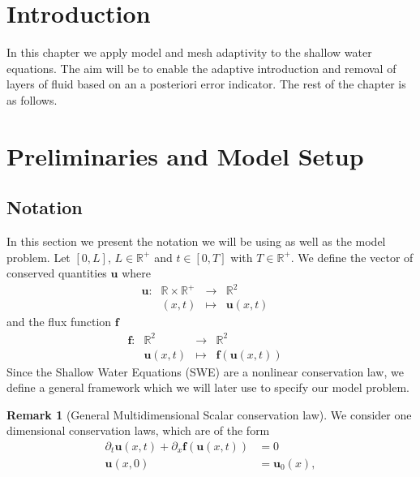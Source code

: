 \documentclass[12pt,a4paper]{article}
\numberwithin{equation}{section}
\theoremstyle{definition}
\newcommand{\dfunkmapsto}[5]{\ensuremath{
		\begin{array}{rccl}
			{#1}: & {#2} &\to&{#3}
			\\
			& {#4} &\mapsto&{#5}
		\end{array}\quad}}
\newcommand{\vect}[1]{\textbf{#1}}
\newcommand{\qp}[1]{\left(#1\right)}
\newcommand{\qb}[1]{\left[#1\right]}
\newtheorem{Rem}[subsection]{Remark}
\begin{document}
\section{Introduction}\label{sec_intro}
In this chapter we apply model and mesh adaptivity to the shallow water equations. The aim will be to enable the adaptive introduction and removal of layers of fluid based on an a posteriori error indicator.  The rest of the chapter is as follows.
\section{Preliminaries and Model Setup}\label{sec:setup}
\subsection{Notation}\label{subsec_modelprob}
In this section we present the notation we will be using as well as the model problem.  Let $\qb{0,L}$, $L\in \mathbb{R}^+$ and $t\in \qb{0,T}$ with $T\in \mathbb{R}^+$.  We define the vector of conserved quantities $\vect{u}$  where
\begin{equation}\label{eq_defn_u_multi_d}
\dfunkmapsto{\textbf{u}}{\mathbb{R}\times\mathbb{R}^+}{\mathbb{R}^2}{\qp{x,t}}{\vect{u}\qp{x,t}}
\end{equation}
and the flux function $\vect{f}$
\begin{equation}
\dfunkmapsto{\textbf{f}}{\mathbb{R}^2}{\mathbb{R}^2}{\vect{u}\qp{x,t}}{\vect{f}\qp{\vect{u}\qp{x,t}}}
\end{equation}
Since the Shallow Water Equations (SWE) are a nonlinear conservation law, we define a general framework which we will later use to specify our model problem.
\begin{Rem}[General Multidimensional Scalar conservation law] We consider one dimensional conservation laws, which are of the form
	\begin{equation}\label{eq_gen_hyp_conservation_law}
	\begin{aligned}
	\partial_t \vect{u}\qp{{x},t}+\partial_x{ \vect{f}\qp{\vect{u}\qp{ x,t}}}&=0\\
	\vect{u}\qp{ x,0}&=\vect{u}_0\qp{ {x}},
	\end{aligned}
	\end{equation}
\end{Rem}
\end{document}
